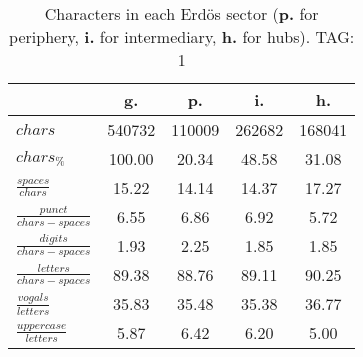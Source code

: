 \begin{table}[h!]
\begin{center}
\begin{tabular}{| l | c | c | c | c |}\hline
 & g. & p. & i. & h. \\\hline
$chars$ & 540732  & 110009  & 262682  & 168041 \\\hline
$chars_{\%}$ & 100.00  & 20.34  & 48.58  & 31.08 \\\hline
$\frac{spaces}{chars}$ & 15.22  & 14.14  & 14.37  & 17.27 \\\hline
$\frac{punct}{chars-spaces}$ & 6.55  & 6.86  & 6.92  & 5.72 \\\hline
$\frac{digits}{chars-spaces}$ & 1.93  & 2.25  & 1.85  & 1.85 \\\hline
$\frac{letters}{chars-spaces}$ & 89.38  & 88.76  & 89.11  & 90.25 \\\hline
$\frac{vogals}{letters}$ & 35.83  & 35.48  & 35.38  & 36.77 \\\hline
$\frac{uppercase}{letters}$ & 5.87  & 6.42  & 6.20  & 5.00 \\\hline
\end{tabular}
\caption{Characters in each Erd\"os sector ({{\bf p.}} for periphery, {{\bf i.}} for intermediary, 
    {{\bf h.}} for hubs). TAG: 1}
\end{center}
\end{table}